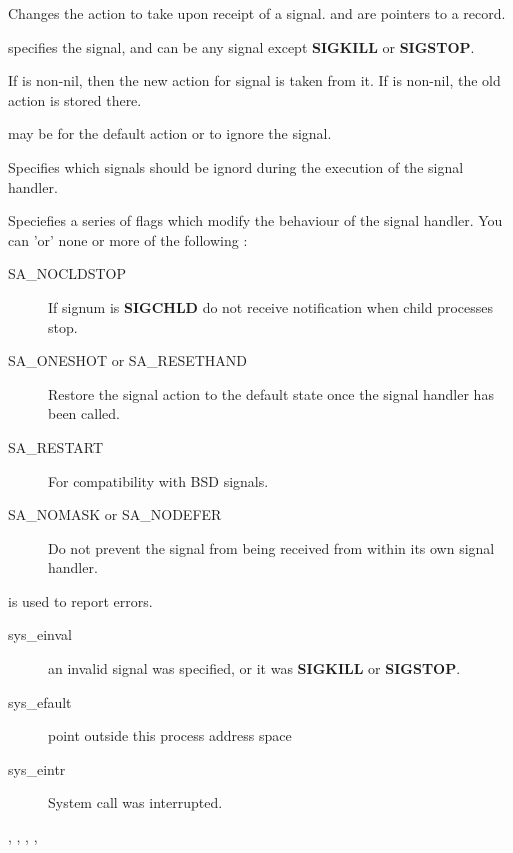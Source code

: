 { Changes the action to take upon receipt of a signal.  and
 are pointers to a  record.

 specifies the signal, and can be any signal except
\textbf{SIGKILL} or \textbf{SIGSTOP}.

If  is non-nil, then the new action for signal  is taken
from it. If  is non-nil, the old action is stored there.

 may be  for the default action or
 to ignore the signal.

 Specifies which signals should be ignord during the execution
of the signal handler.

 Speciefies a series of flags which modify the behaviour of
the signal handler. You can 'or' none or more of the following :
\begin{description}
\item[SA\_NOCLDSTOP] If signum is \textbf{SIGCHLD} do not receive
notification when child processes stop.
\item[SA\_ONESHOT or SA\_RESETHAND] Restore the signal action to the default
state once the signal handler has been called.
\item[SA\_RESTART] For compatibility with BSD signals.
\item[SA\_NOMASK or SA\_NODEFER] Do not prevent the signal from being received
from within its own signal handler.
\end{description}
}
{ is used to report errors.
\begin{description}
\item[sys\_einval] an invalid signal was specified, or it was
\textbf{SIGKILL} or \textbf{SIGSTOP}.
\item[sys\_efault]  point outside this process address space
\item[sys\_eintr] System call was interrupted.
\end{description}
}
{
, , , ,
}

